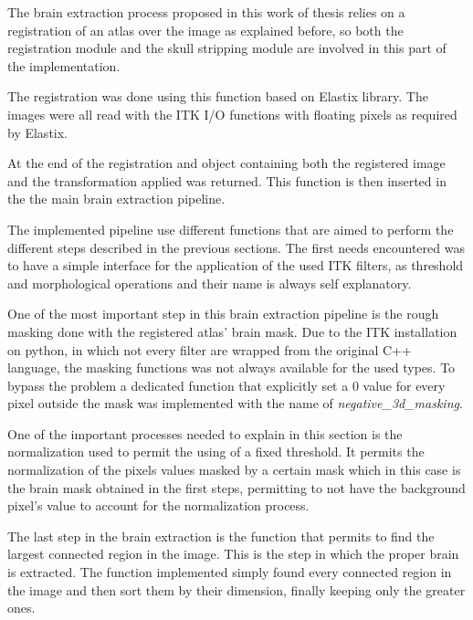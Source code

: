\documentclass{standalone}
\begin{document}
The brain extraction process proposed in this work of thesis relies on a registration of an atlas over the image as explained before, so both the registration module and the skull stripping module are involved in this part of the implementation.

The registration was done using this function based on Elastix library.
The images were all read with the ITK I/O functions with floating pixels as required by Elastix.



At the end of the registration and object containing both the registered image and the transformation applied was returned. This function is then inserted in the the main brain extraction pipeline. 

The implemented pipeline use different functions that are aimed to perform the different steps described in the previous sections.
The first needs encountered was to have a simple interface for the application of the used ITK filters, as threshold and morphological operations and their name is always self explanatory.

% 

One of the most important step in this brain extraction pipeline is the rough masking done with the registered atlas' brain mask. Due to the ITK installation on python, in which not every filter are wrapped from the original C++ language, the masking functions was not always available for the used types. To bypass the problem a dedicated function that explicitly set a $0$ value for every pixel outside the mask was implemented with the name of \emph{negative\_3d\_masking}.

% 

One of the important processes needed to explain in this section is the normalization used to permit the using of a fixed threshold. It permits the normalization of the pixels values masked by a certain mask which in this case is the brain mask obtained in the first steps, permitting to not have the background pixel's value to account for the normalization process.

% 

The last step in the brain extraction is the function that permits to find the largest connected region in the image. This is the step in which the proper brain is extracted.
The function implemented simply found every connected region in the image and then sort them by their dimension, finally keeping only the greater ones.
\end{document}
